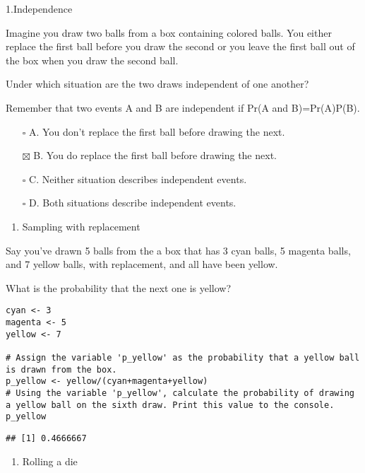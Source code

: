 \documentclass[
]{article}
\providecommand{\tightlist}{%
  \setlength{\itemsep}{0pt}\setlength{\parskip}{0pt}}
\begin{document}
1.Independence

Imagine you draw two balls from a box containing colored balls. You
either replace the first ball before you draw the second or you leave
the first ball out of the box when you draw the second ball.

Under which situation are the two draws independent of one another?

Remember that two events A and B are independent if Pr(A and
B)=Pr(A)P(B).

\begin{itemize}
\tightlist
\item[$\square$]
  A. You don't replace the first ball before drawing the next.
\item[$\boxtimes$]
  B. You do replace the first ball before drawing the next.
\item[$\square$]
  C. Neither situation describes independent events.
\item[$\square$]
  D. Both situations describe independent events.
\end{itemize}

\begin{enumerate}
\def\labelenumi{\arabic{enumi}.}
\setcounter{enumi}{1}
\tightlist
\item
  Sampling with replacement
\end{enumerate}

Say you've drawn 5 balls from the a box that has 3 cyan balls, 5 magenta
balls, and 7 yellow balls, with replacement, and all have been yellow.

What is the probability that the next one is yellow?

\begin{verbatim}
cyan <- 3
magenta <- 5
yellow <- 7

# Assign the variable 'p_yellow' as the probability that a yellow ball is drawn from the box.
p_yellow <- yellow/(cyan+magenta+yellow)
# Using the variable 'p_yellow', calculate the probability of drawing a yellow ball on the sixth draw. Print this value to the console.
p_yellow
\end{verbatim}

\begin{verbatim}
## [1] 0.4666667
\end{verbatim}

\begin{enumerate}
\def\labelenumi{\arabic{enumi}.}
\setcounter{enumi}{2}
\tightlist
\item
  Rolling a die
\end{enumerate}
\end{document}
